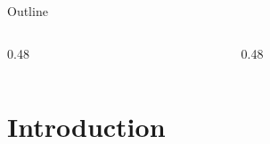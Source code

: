 %


\begin{frame}[plain]
  \titlepage
\end{frame}


\begin{frame}{Outline}
  \vfill
  \begin{columns}[c, onlytextwidth]
    \begin{column}{0.48\textwidth}
      \tableofcontents[sections={1-3}]
    \end{column}
    \begin{column}{0.48\textwidth}
      \tableofcontents[sections={4-7}]
    \end{column}
  \end{columns}
  \vfill
\end{frame}

\section{Introduction}

